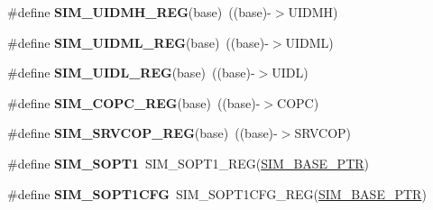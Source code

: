 \begin{DoxyCompactItemize}
\item 
\mbox{\label{group___s_i_m___register___accessor___macros_ga1f5eac1bbac9b6798958b4697632ef21}} 
\#define {\bfseries S\+I\+M\+\_\+\+U\+I\+D\+M\+H\+\_\+\+R\+EG}(base)~((base)-\/$>$U\+I\+D\+MH)
\item 
\mbox{\label{group___s_i_m___register___accessor___macros_ga7c4e741241b9fc954f2cd568d29b6b45}} 
\#define {\bfseries S\+I\+M\+\_\+\+U\+I\+D\+M\+L\+\_\+\+R\+EG}(base)~((base)-\/$>$U\+I\+D\+ML)
\item 
\mbox{\label{group___s_i_m___register___accessor___macros_gac4adca94e35e9cb122f6e0f80510708f}} 
\#define {\bfseries S\+I\+M\+\_\+\+U\+I\+D\+L\+\_\+\+R\+EG}(base)~((base)-\/$>$U\+I\+DL)
\item 
\mbox{\label{group___s_i_m___register___accessor___macros_ga24b7bb2caf49ac6a5bea962ae761d371}} 
\#define {\bfseries S\+I\+M\+\_\+\+C\+O\+P\+C\+\_\+\+R\+EG}(base)~((base)-\/$>$C\+O\+PC)
\item 
\mbox{\label{group___s_i_m___register___accessor___macros_gaf4814908256050a2818ca29f249545c2}} 
\#define {\bfseries S\+I\+M\+\_\+\+S\+R\+V\+C\+O\+P\+\_\+\+R\+EG}(base)~((base)-\/$>$S\+R\+V\+C\+OP)
\item 
\mbox{\label{group___s_i_m___register___accessor___macros_ga2a1bceb27d0e81b2821f1f4f32a57c12}} 
\#define {\bfseries S\+I\+M\+\_\+\+S\+O\+P\+T1}~S\+I\+M\+\_\+\+S\+O\+P\+T1\+\_\+\+R\+EG(\hyperlink{group___s_i_m___peripheral_ga719ec5df95fbb5732438f794f2cccf3c}{S\+I\+M\+\_\+\+B\+A\+S\+E\+\_\+\+P\+TR})
\item 
\mbox{\label{group___s_i_m___register___accessor___macros_ga952eea950ed91143774362df3d00d2b1}} 
\#define {\bfseries S\+I\+M\+\_\+\+S\+O\+P\+T1\+C\+FG}~S\+I\+M\+\_\+\+S\+O\+P\+T1\+C\+F\+G\+\_\+\+R\+EG(\hyperlink{group___s_i_m___peripheral_ga719ec5df95fbb5732438f794f2cccf3c}{S\+I\+M\+\_\+\+B\+A\+S\+E\+\_\+\+P\+TR})
\item 
\mbox{\label{group___s_i_m___register___accessor___macros_ga487453818a3716783fc75d7bcb81de9f}} 

\end{DoxyCompactItemize}
